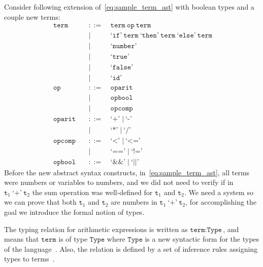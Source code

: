 \documentclass[
  oneside,
  english,
  coorientadorbanca,
  noabntexcite
]{ufsc-thesis-rn46-2019}
\def\bnfdef{::=}
\newcommand{\code}[1]{\texttt{#1}}
\newcommand{\bnfvar}[1]{\ \bnfvars{#1}}
\newcommand{\bnfvars}[1]{\code{#1}}
\newcommand{\bnfter}[1]{\ \bnfters{#1}}
\newcommand{\bnfters}[1]{\textrm{`}\code{#1}\textrm{'}}
\newcommand{\bnfor}[1]{\;\mid{} #1}
\newcommand{\bnfprod}[2]{\bnfvars{#1} &\ &\bnfdef& #2}
\newcommand{\bnfmore}[1]{ && \mid{} & #1}
\begin{document}
Consider following extension of~\eqref{eq:sample_term_ast} with boolean types and a couple new terms:
\begin{equation}~\label{eq:sample_term_ast_bool}
  \begin{alignedat}{2}
    \bnfprod{term}{\bnfvar{term} \bnfvar{op} \bnfvar{term}} \\
    \bnfmore{\bnfter{if} \bnfvar{term} \bnfter{then} \bnfvar{term} \bnfter{else} \bnfvar{term}} \\
    \bnfmore{\bnfter{number}}                              \\
    \bnfmore{\bnfter{true}}                              \\
    \bnfmore{\bnfter{false}}                              \\
    \bnfmore{\bnfter{id}} \\
    \bnfprod{op}{\bnfvar{oparit}} \\
    \bnfmore{\bnfvar{opbool}} \\
    \bnfmore{\bnfvar{opcomp}} \\
    \bnfprod{oparit}{\bnfter{+} \bnfor{\bnfter{-}}} \\
    \bnfmore{\bnfter{*} \bnfor{\bnfter{/}}} \\
    \bnfprod{opcomp}{\bnfter{<} \bnfor{\bnfter{<=}}} \\
    \bnfmore{\bnfter{==} \bnfor{\bnfter{!=}}} \\
    \bnfprod{opbool}{\bnfter{\&\&} \bnfor{\bnfter{||}}}
  \end{alignedat}
\end{equation}
Before the new abstract syntax constructs, in~\eqref{eq:sample_term_ast}, all terms were numbers or variables to numbers, and we did not need to verify if in $\bnfvars{t}_1 \bnfter{+} \bnfvar{t}_2$ the sum operation was well-defined for $\bnfvars{t}_1$ and $\bnfvars{t}_2$.
We need a system so we can prove that both $\bnfvars{t}_1$ and $\bnfvars{t}_2$ are numbers in $\bnfvars{t}_1 \bnfter{+} \bnfvar{t}_2$, for accomplishing the goal we introduce the formal notion of types.

The typing relation for arithmetic expressions is written as $\bnfvars{term} : \bnfvars{Type}$, and means that $\bnfvars{term}$ is of type $\bnfvars{Type}$ where $\bnfvars{Type}$ is a new syntactic form for the types of the language~\cite{pierce2002types}. Also, the relation is defined by a set of inference rules assigning types to terms~\cite{pierce2002types}.
\end{document}
